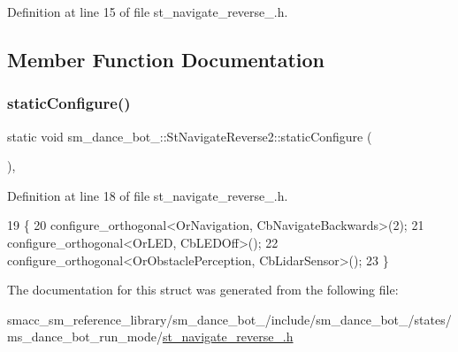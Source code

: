 Definition at line 15 of file st\+\_\+navigate\+\_\+reverse\+\_.\+h.



\subsection{Member Function Documentation}
\mbox{\label{structsm__dance__bot__2_1_1StNavigateReverse2_acef3a24cf17f19e5732fef608bc323a1}} 
\subsubsection{\texorpdfstring{static\+Configure()}{staticConfigure()}}
{\footnotesize\ttfamily static void sm\+\_\+dance\+\_\+bot\+\_\+::\+St\+Navigate\+Reverse2\+::static\+Configure (\begin{DoxyParamCaption}{ }\end{DoxyParamCaption})\hspace{0.3cm}{\ttfamily [inline]}, {\ttfamily [static]}}



Definition at line 18 of file st\+\_\+navigate\+\_\+reverse\+\_.\+h.


\begin{DoxyCode}
19    \{
20       configure\_orthogonal<OrNavigation, CbNavigateBackwards>(2);
21       configure\_orthogonal<OrLED, CbLEDOff>();
22       configure\_orthogonal<OrObstaclePerception, CbLidarSensor>();
23    \}
\end{DoxyCode}


The documentation for this struct was generated from the following file\+:\begin{DoxyCompactItemize}
\item 
smacc\+\_\+sm\+\_\+reference\+\_\+library/sm\+\_\+dance\+\_\+bot\+\_/include/sm\+\_\+dance\+\_\+bot\+\_/states/ms\+\_\+dance\+\_\+bot\+\_\+run\+\_\+mode/\hyperlink{2_2include_2sm__dance__bot__2_2states_2ms__dance__bot__run__mode_2st__navigate__reverse__2_8h}{st\+\_\+navigate\+\_\+reverse\+\_.\+h}\end{DoxyCompactItemize}

